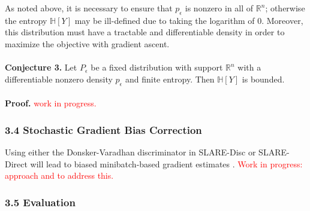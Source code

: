 \documentclass{NSF}
\begin{document}
As noted above, it is necessary to ensure that $p_\epsilon$ is
nonzero in all of $\mathbb{R}^n$; otherwise the entropy $\mathbb{H}[Y]$ may be
ill-defined due to taking the logarithm of 0. Moreover, this distribution must have a
tractable and differentiable density in order to maximize the objective with gradient ascent.
\\
\\
\textbf{Conjecture 3.} Let $P_\epsilon$ be a fixed distribution with support $\mathbb{R}^n$ with a differentiable nonzero density $p_\epsilon$ and finite entropy. Then $\mathbb{H}[Y]$ is bounded.
\\
\\
\textbf{Proof.} \textcolor{red}{work in progress.}

\subsubsection{3.4 Stochastic Gradient Bias Correction}

Using either the Donsker-Varadhan discriminator in SLARE-Disc or SLARE-Direct will lead to biased minibatch-based gradient estimates \citep{belghazi2018mine}. \textcolor{red}{Work in progress: approach and to address this.}

\subsubsection{3.5 Evaluation}
\end{document}
